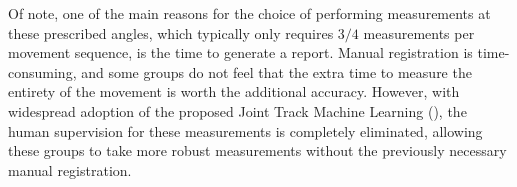 Of note, one of the main reasons for the choice of performing measurements at these prescribed angles, which typically only requires $3/4$ measurements per movement sequence, is the time to generate a report.
Manual registration is time-consuming, and some groups do not feel that the extra time to measure the entirety of the movement is worth the additional accuracy.
However, with widespread adoption of the proposed Joint Track Machine Learning (), the human supervision for these measurements is completely eliminated, allowing these groups to take more robust measurements without the previously necessary manual registration.



